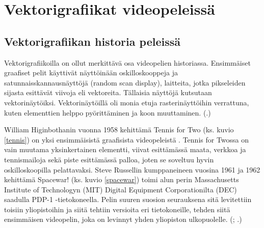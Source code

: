 \documentclass[utf8,bachelor]{gradu3}
\newcommand{\parencitedot}[1]{(\cite{#1}.)}
\newcommand{\parencitesdot}[2]{(\cite{#1}; \cite{#2}.)}
\begin{document}
\chapter{Vektorigrafiikat videopeleissä}

\section{Vektorigrafiikan historia peleissä}


Vektorigrafiikoilla on ollut merkittävä osa videopelien historiassa. Ensimmäiset graafiset pelit käyttivät näyttöinään oskilloskooppeja ja satunnaisskannausnäyttöjä (random scan display), laitteita, jotka pikseleiden sijasta esittävät viivoja eli vektoreita. Tällaisia näyttöjä kutsutaan vektorinäytöiksi. Vektorinäytöillä oli monia etuja rasterinäyttöihin verrattuna, kuten elementtien helppo pyörittäminen ja koon muuttaminen. \parencitedot{RefWorks:doc:5be179afe4b05afcfde72671}

William Higinbothanin vuonna 1958 kehittämä Tennis for Two (ks. kuvio \ref{tennis}) on yksi ensimmäisistä graafisista videopeleistä \parencite{RefWorks:doc:5be15b13e4b05b9281959f24}. Tennis for Twossa on vain muutama yksinkertainen elementti, viivat esittämässä maata, verkkoa ja tennismailoja sekä piste esittämässä palloa, joten se soveltuu hyvin oskilloskoopilla pelattavaksi. Steve Russellin kumppaneineen vuosina 1961 ja 1962 kehittämä Spacewar! (ks. kuvio \ref{spacewar}) toimi alun perin Massachusetts Institute of Technologyn (MIT) Digital Equipment Corporationilta (DEC) saadulla PDP-1 -tietokoneella. Pelin suuren suosion seurauksena sitä levitettiin toisiin yliopistoihin ja siitä tehtiin versioita eri tietokoneille, tehden siitä ensimmäisen videopelin, joka on levinnyt yhden yliopiston ulkopuolelle. \parencitesdot{RefWorks:doc:5be15b13e4b05b9281959f24}{RefWorks:doc:5be9d948e4b0304fd3d1692a}
\end{document}
